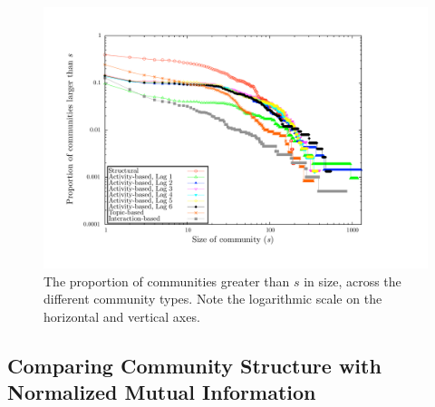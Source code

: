 \begin{figure}[ht]
  \centering
\includegraphics[width=1\textwidth]{cdf_comm_sizes}
\caption{The proportion of communities greater than $s$ in size, across the different community types. Note the logarithmic scale on the horizontal and vertical axes.}
\label{Fig-community_size_distribution}
\end{figure}




\subsection{Comparing Community Structure with Normalized Mutual Information}

